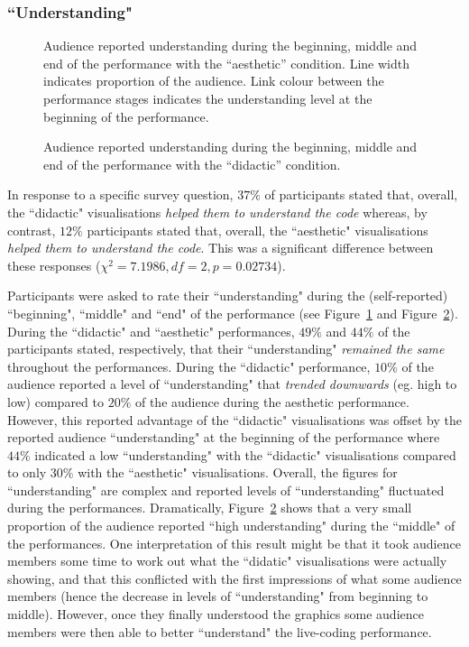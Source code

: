 \documentclass{sig-alternate}
\begin{document}
\subsubsection{``Understanding"}

\begin{figure}
\centering
{}
\caption{Audience reported understanding during the beginning, middle and end of the performance with the ``aesthetic'' condition. Line width indicates proportion of the audience. Link colour between the performance stages indicates the understanding level at the beginning of the performance.}
\label{fig:aesthetic-understanding}
\end{figure}

\begin{figure}
\centering
{}
\caption{Audience reported understanding during the beginning, middle and end of the performance with the ``didactic'' condition.}
\label{fig:didactic-understanding}
\end{figure}

In response to a specific survey question, $37\%$ of participants stated that, overall, the ``didactic" visualisations {\it helped them to understand the code} whereas, by contrast, $12\%$ participants stated that, overall, the ``aesthetic" visualisations {\it helped them to understand the code}. This was a significant difference between these responses ($\chi^2=7.1986,df=2,p=0.02734$).

Participants were asked to rate their ``understanding" during the (self-reported) ``beginning", ``middle" and ``end" of the performance (see Figure~\ref{fig:aesthetic-understanding} and Figure~\ref{fig:didactic-understanding}). During the ``didactic" and ``aesthetic" performances, $49\%$ and $44\%$ of the participants stated, respectively, that their ``understanding" {\it remained the same} throughout the performances. During the ``didactic" performance, $10\%$ of the audience reported a level of ``understanding" that {\it trended downwards} (eg. high to low) compared to $20\%$ of the audience during the aesthetic performance. However, this reported advantage of the ``didactic" visualisations was offset by the reported audience ``understanding" at the beginning of the performance where $44\%$ indicated a low ``understanding" with the ``didactic" visualisations compared to only $30\%$ with the ``aesthetic" visualisations. Overall, the figures for ``understanding" are complex and reported levels of ``understanding" fluctuated during the performances. Dramatically, Figure~\ref{fig:didactic-understanding} shows that a very small proportion of the audience reported ``high understanding" during the ``middle" of the performances. One interpretation of this result might be that it took audience members some time to work out what the ``didatic" visualisations were actually showing, and that this conflicted with the first impressions of what some audience members (hence the decrease in levels of ``understanding" from beginning to middle). However, once they finally understood the graphics some audience members were then able to better ``understand" the live-coding performance. 
\end{document}
